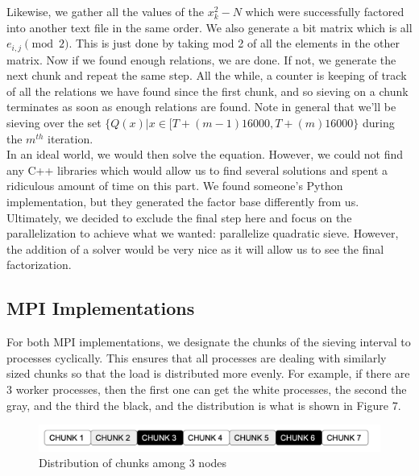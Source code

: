 \documentclass[11pt,twocolumn]{article}
\begin{document}
Likewise, we gather all the values of the $x_k^2 - N$ which were successfully factored into another text file in the same order. We also generate a bit matrix which is all $e_{i, j} \pmod{2}$. This is just done by taking mod 2 of all the elements in the other matrix. Now if we found enough relations, we are done. If not, we generate the next chunk and repeat the same step. All the while, a counter is keeping of track of all the relations we have found since the first chunk, and so sieving on a chunk terminates as soon as enough relations are found. Note in general that we'll be sieving over the set $\{Q(x) | x \in [T + (m-1)16000, T + (m)16000 \}$ during the $m^{th}$ iteration. \\
\indent In an ideal world, we would then solve the equation. However, we could not find any C++ libraries which would allow us to find several solutions and spent a ridiculous amount of time on this part. We found someone's Python implementation, but they generated the factor base differently from us. Ultimately, we decided to exclude the final step here and focus on the parallelization to achieve what we wanted: parallelize quadratic sieve. However, the addition of a solver would be very nice as it will allow us to see the final factorization.

\subsection{MPI Implementations}
For both MPI implementations, we designate the chunks of the sieving interval to processes cyclically. This ensures that all processes are dealing with similarly sized chunks so that the load is distributed more evenly. For example, if there are 3 worker processes, then the first one can get the white processes, the second the gray, and the third the black, and the distribution is what is shown in Figure 7.

\begin{figure}[!htb]
    \centering
    \includegraphics[scale = 0.2]{chunks.png}
    \caption{Distribution of chunks among 3 nodes}
    \label{chunks}
\end{figure}
\end{document}
